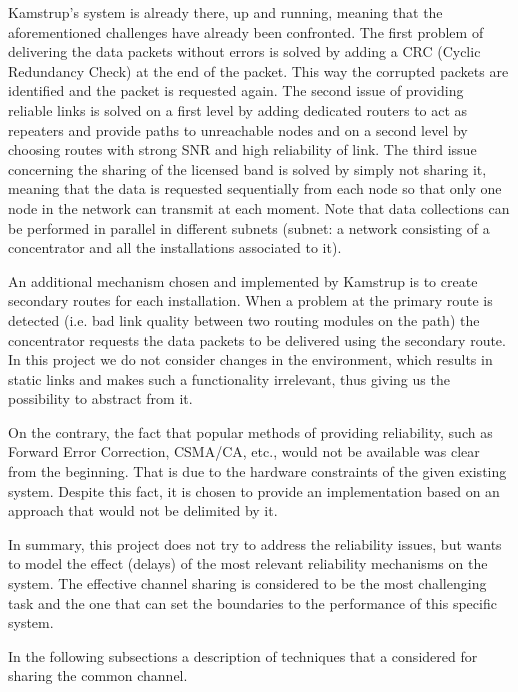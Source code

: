 Kamstrup's system is already there, up and running, meaning that the aforementioned challenges have already been confronted. The first problem of delivering the data packets without errors is solved by adding a CRC (Cyclic Redundancy Check) at the end of the packet. This way the corrupted packets are identified and the packet is requested again. The second issue of providing reliable links is solved on a first level by adding dedicated routers to act as repeaters and provide paths to unreachable nodes and on a second level by choosing routes with strong SNR and high reliability of link. The third issue concerning the sharing of the licensed band is solved by simply not sharing it, meaning that the data is requested sequentially from each node so that only one node in the network can transmit at each moment. Note that data collections can be performed in parallel in different subnets (subnet: a network consisting of a concentrator and all the installations associated to it). %

An additional mechanism chosen and implemented by Kamstrup is to create secondary routes for each installation. When a problem at the primary route is detected (i.e. bad link quality between two routing modules on the path) the concentrator requests the data packets to be delivered using the secondary route. In this project we do not consider changes in the environment, which results in static links and makes such a functionality irrelevant, thus giving us the possibility to abstract from it.

On the contrary, the fact that popular methods of providing reliability, such as Forward Error Correction, CSMA/CA, etc., would not be available was clear from the beginning. That is due to the hardware constraints of the given existing system. Despite this fact, it is chosen to provide an implementation based on an approach that would not be delimited by it.

In summary, this project does not try to address the reliability issues, but wants to model the effect (delays) of the most relevant reliability mechanisms on the system. The effective channel sharing is considered to be the most challenging task and the one that can set the boundaries to the performance of this specific system.

In the following subsections a description of techniques that a considered for sharing the common channel.

